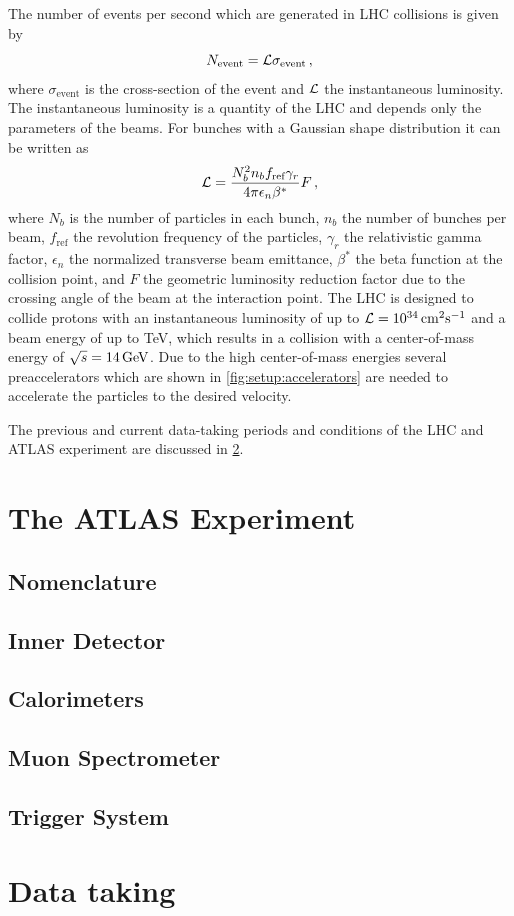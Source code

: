 The number of events per second which are generated in LHC collisions is given by
\begin{equation}
    N_\text{event} = \mathcal{L} \sigma_\text{event} \,,
\end{equation}
where $\sigma_\text{event}$ is the cross-section of the event and $\mathcal{L}$ the instantaneous luminosity.
The instantaneous luminosity is a quantity of the LHC and depends only the parameters of the beams.
For bunches with a Gaussian shape distribution it can be written as~\cite{LHC}
\begin{equation}
    \mathcal{L} = \frac{N_b^2 n_b f_\text{ref} \gamma_r}{4 \pi \epsilon_n \beta^*} F \,,
\end{equation}
where $N_b$ is the number of particles in each bunch, $n_b$ the number of bunches per beam, $f_\text{ref}$ the revolution
frequency of the particles, $\gamma_r$ the relativistic gamma factor, $\epsilon_n$ the normalized transverse beam emittance,
$\beta^*$ the beta function at the collision point, and $F$ the geometric luminosity reduction factor
due to the crossing angle of the beam at the interaction point.
The LHC is designed to collide protons with an instantaneous luminosity of up to $\lumi = \unit[10^{34}]{cm^2 s^{-1}}$
and a beam energy of up to \unit[7]{TeV}, which results in a collision with a center-of-mass energy of
$\sqrt{s} = \unit[14]{GeV}$.
Due to the high center-of-mass energies several preaccelerators which are shown in \cref{fig:setup:accelerators}
are needed to accelerate the particles to the desired velocity.

The previous and current data-taking periods and conditions of the LHC and ATLAS experiment are discussed in \cref{sec:setup:data}.

\section{The ATLAS Experiment}\label{sec:setup:atlas}

\subsection{Nomenclature}\label{sub:setup:nomenclature}

\subsection{Inner Detector}\label{sub:setup:id}

\subsection{Calorimeters}\label{sub:setup:calorimeters}

\subsection{Muon Spectrometer}\label{sub:setup:muons}

\subsection{Trigger System}\label{sub:setup:trigger}

\section{Data taking}\label{sec:setup:data}
